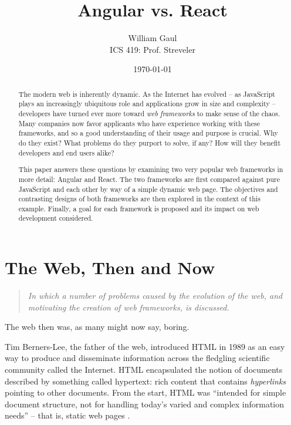 \documentclass[12pt,letterpaper]{article}
\title{\textbf{Angular vs. React}}
\author{William Gaul\\{ICS 419: Prof. Streveler}}
\date{\today}
\begin{document}
\maketitle

\begin{singlespace*}
\begin{abstract}
	The modern web is inherently dynamic. As the Internet has evolved -- as JavaScript plays an increasingly ubiquitous role and applications grow in size and complexity -- developers have turned ever more toward \emph{web frameworks} to make sense of the chaos. Many companies now favor applicants who have experience working with these frameworks, and so a good understanding of their usage and purpose is crucial. Why do they exist? What problems do they purport to solve, if any? How will they benefit developers and end users alike?

	This paper answers these questions by examining two very popular web frameworks in more detail: Angular and React. The two frameworks are first compared against pure JavaScript and each other by way of a simple dynamic web page. The objectives and contrasting designs of both frameworks are then explored in the context of this example. Finally, a goal for each framework is proposed and its impact on web development considered.
\end{abstract}
\end{singlespace*}


\section{The Web, Then and Now}
\vspace{-12pt}

\begin{quote}
	\singlespacing
	\emph{In which a number of problems caused by the evolution of the web, and motivating the creation of web frameworks, is discussed.}
\end{quote}

The web then was, as many might now say, boring.

Tim Berners-Lee, the father of the web, introduced HTML in 1989 as an easy way to produce and disseminate information across the fledgling scientific community called the Internet. HTML encapsulated the notion of documents described by something called hypertext: rich content that contains \emph{hyperlinks} pointing to other documents. From the start, HTML was ``intended for simple document structure, not for handling today's varied and complex information needs'' \cite[p.~9]{Sklar:2012} -- that is, static web pages \cite{Schlensker:2014}.
\end{document}
